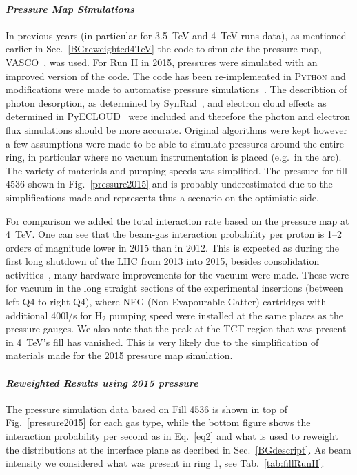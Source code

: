 \paragraph{\textit{Pressure Map Simulations}}
In previous years (in particular for 3.5~TeV and 4~TeV runs data), as mentioned earlier in Sec.~\ref{BGreweighted4TeV} the code to simulate the pressure map, \textsc{VASCO}~\cite{vascoRef}, was used. For Run II in 2015, pressures were simulated with an improved version of the code. The code has been re-implemented in \textsc{Python} and modifications were made to automatise pressure simulations~\cite{christinasStudent}. The describtion of photon desorption, as determined by SynRad~\cite{synradRef}, and electron cloud effects as determined in PyECLOUD~\cite{giovanniPhd} were included and therefore the photon and electron flux simulations should be more accurate. Original algorithms were kept however a few assumptions were made to be able to simulate pressures around the entire ring, in particular where no vacuum instrumentation is placed (e.g.~in the arc). The variety of materials and pumping speeds was simplified. The pressure for fill 4536 shown in Fig.~\ref{pressure2015} and is probably underestimated due to the simplifications made and represents thus a scenario on the optimistic side. 

For comparison we added the total interaction rate based on the pressure map at 4~TeV. One can see that the beam-gas interaction probability per proton is 1--2 orders of magnitude lower in 2015 than in 2012. This is expected as during the first long shutdown of the LHC from 2013 into 2015, besides consolidation activities~\cite{KatyForazIpac14}, many hardware improvements for the vacuum were made. These were for vacuum in the long straight sections of the experimental insertions (between left Q4 to right Q4), where NEG (Non-Evapourable-Gatter) cartridges with additional 400l/s for H$_2$ pumping speed were installed at the same places as the pressure gauges. We also note that the peak at the TCT region that was present in 4~TeV's fill has vanished. This is very likely due to the simplification of materials made for the 2015 pressure map simulation.


\paragraph{\textit{Reweighted Results using 2015 pressure}}

The pressure simulation data based on Fill 4536 is shown in top of Fig.~\ref{pressure2015} for each gas type, while the bottom figure shows the interaction probability per second as in Eq.~\ref{eq2} and what is used to reweight the distributions at the interface plane as decribed in Sec.~\ref{BGdescript}. As beam intensity we considered what was present in ring 1, see Tab.~\ref{tab:fillRunII}.


